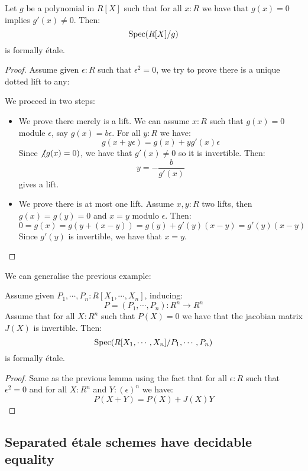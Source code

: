 \begin{proposition}
Let $g$ be a polynomial in $R[X]$ such that for all $x:R$ we have that $g(x)=0$ implies $g'(x)\not=0$. Then:
\[\operatorname{Spec}(R[X]/g)\]
is formally étale.
\end{proposition}

\begin{proof}
Assume given $\epsilon:R$ such that $\epsilon^2=0$, we try to prove there is a unique dotted lift to any:
    \begin{center}
    \end{center}
We proceed in two steps:
\begin{itemize}
\item We prove there merely is a lift. We can assume $x:R$ such that $g(x)=0$ module $\epsilon$, say $g(x)=b\epsilon$. For all $y:R$ we have:
\[g(x+y\epsilon) = g(x)+ y g'(x) \epsilon\]
Since $\not\not(g(x)=0)$, we have that $g'(x)\not=0$ so it is invertible. Then: 
\[y=-\frac{b}{g'(x)}\]
gives a lift.
\item We prove there is at most one lift. Assume $x,y:R$ two lifts, then $g(x)=g(y)=0$ and $x=y$ modulo $\epsilon$. Then:
\[0 = g(x) = g(y + (x - y)) = g(y) + g'(y) (x-y) = g'(y) (x- y)\]
Since $g'(y)$ is invertible, we have that $x=y$.
\end{itemize}
\end{proof}

We can generalise the previous example:

\begin{proposition}
Assume given $P_1,\cdots,P_n : R[X_1,\cdots, X_n]$, inducing:
\[P = (P_1,\cdots,P_n) : R^n \to R^n\]
Assume that for all $X:R^n$ such that $P(X)=0$ we have that the jacobian matrix $J(X)$ is invertible. Then:
\[\operatorname{Spec}(R[X_1,\cdots, X_n]/P_1,\cdots,P_n)\]
is formally étale.
\end{proposition}

\begin{proof}
Same as the previous lemma using the fact that for all $\epsilon:R$ such that $\epsilon^2=0$ and for all $X:R^n$ and $Y:(\epsilon)^n$ we have:
\[P(X+Y) = P(X) + J(X)Y\]
\end{proof}

\subsection{Separated étale schemes have decidable equality}

